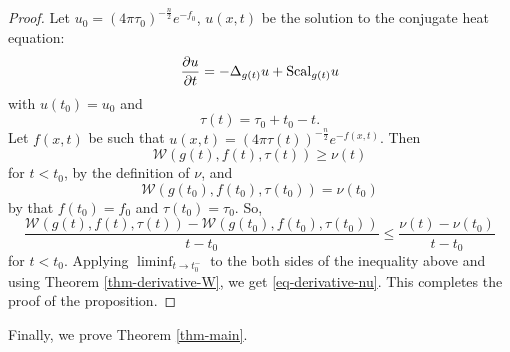 \documentclass[12pt]{amsart}
\def\p{\partial}
\def\W{{\mathcal W}}
\def\Scal{{\rm Scal}}
\theoremstyle{definition}
\theoremstyle{remark}
\numberwithin{equation}{section}
\begin{document}
\begin{proof}
Let $u_0=(4\pi \tau_0)^{-\frac{n}{2}}e^{-f_0}$, $u(x,t)$ be the solution to the conjugate heat equation:
$$\frac{\p u}{\p t}=-\Delta_{g(t)} u+\Scal_{g(t)} u$$
with $u(t_0)=u_0$ and $$\tau(t)=\tau_0+t_0-t.$$
Let $f(x,t)$ be such that $u(x,t)=(4\pi \tau(t))^{-\frac{n}{2}}e^{-f(x,t)}$. Then
$$\W(g(t),f(t),\tau(t))\geq\nu(t)$$
for $t<t_0$, by the definition of $\nu$, and 
$$\W(g(t_0),f(t_0),\tau(t_0))=\nu(t_0)$$
by that $f(t_0)=f_0$ and $\tau(t_0)=\tau_0$. So, 
$$\frac{\W(g(t),f(t),\tau(t))-\W(g(t_0),f(t_0),\tau(t_0))}{t-t_0}\leq \frac{\nu(t)-\nu(t_0)}{t-t_0}$$
for $t<t_0$. Applying $\displaystyle\liminf_{t\to t_0^-}$ to the both sides of the inequality above and using Theorem \ref{thm-derivative-W}, we get \eqref{eq-derivative-nu}. This completes the proof of the proposition.
\end{proof}
Finally, we prove Theorem \ref{thm-main}.
\end{document}
